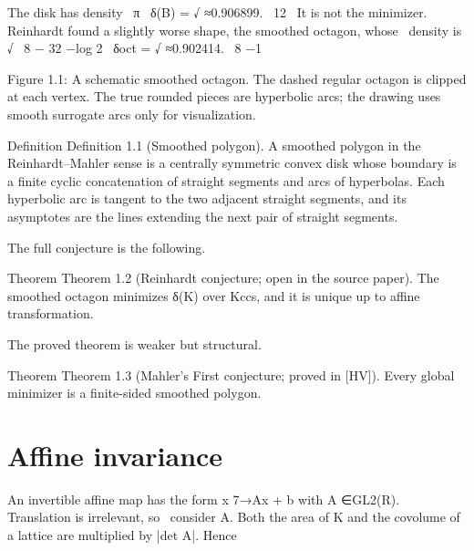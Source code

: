 \begin{displaytext}
The disk has density \
π \
δ(B) = √ ≈0.906899. \
12 \
It is not the minimizer. Reinhardt found a slightly worse shape, the smoothed octagon, whose \
density is √ \
8 − 32 −log 2 \
δoct = √ ≈0.902414. \
8 −1
\end{displaytext}

\begin{figureplaceholder}
Figure 1.1: A schematic smoothed octagon. The dashed regular octagon is clipped at each vertex. The true rounded pieces are hyperbolic arcs; the drawing uses smooth surrogate arcs only for visualization.
\end{figureplaceholder}

\begin{statementbox}{Definition}
Definition 1.1 (Smoothed polygon). A smoothed polygon in the Reinhardt–Mahler sense is a centrally symmetric convex disk whose boundary is a finite cyclic concatenation of straight segments and arcs of hyperbolas. Each hyperbolic arc is tangent to the two adjacent straight segments, and its asymptotes are the lines extending the next pair of straight segments.
\end{statementbox}

The full conjecture is the following.


\begin{statementbox}{Theorem}
Theorem 1.2 (Reinhardt conjecture; open in the source paper). The smoothed octagon minimizes δ(K) over Kccs, and it is unique up to affine transformation.
\end{statementbox}

The proved theorem is weaker but structural.


\begin{statementbox}{Theorem}
Theorem 1.3 (Mahler’s First conjecture; proved in [HV]). Every global minimizer is a finite-sided smoothed polygon.
\end{statementbox}

\section{Affine invariance}

\begin{displaytext}
An invertible affine map has the form x 7→Ax + b with A ∈GL2(R). Translation is irrelevant, so \
consider A. Both the area of K and the covolume of a lattice are multiplied by |det A|. Hence
\end{displaytext}


